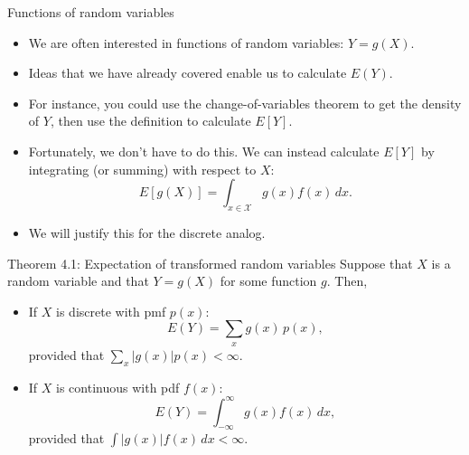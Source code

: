 \begin{frame}[allowframebreaks]{Functions of random variables}
  \begin{itemize}
    \item We are often interested in functions of random variables: $Y = g(X)$.
    \item Ideas that we have already covered enable us to calculate $E(Y)$.
    \item For instance, you could use the change-of-variables theorem to get the density of $Y$, then use the definition to calculate $E[Y]$.
    \item Fortunately, we don't have to do this. We can instead calculate $E[Y]$ by integrating (or summing) with respect to $X$:
    $$
    E[g(X)] = \int_{x \in \mathcal{X}} g(x)f(x) \, dx.
    $$
    \item We will justify this for the discrete analog.
  \end{itemize}
  
  \framebreak
  
  \begin{block}{Theorem 4.1: Expectation of transformed random variables}
    Suppose that $X$ is a random variable and that $Y = g(X)$ for some function $g$. Then,
    \begin{itemize}
      \item If $X$ is discrete with pmf $p(x)$:
      $$
      E(Y) = \sum_x g(x)\, p(x),
      $$
      provided that $\sum_x |g(x)| p(x) < \infty$.
      \item If $X$ is continuous with pdf $f(x)$:
      $$
      E(Y) = \int_{-\infty}^\infty g(x) f(x)\, dx,
      $$
      provided that $\int |g(x)| f(x) \, dx < \infty$.
    \end{itemize}
  \end{block}
  
  \end{frame}
  

